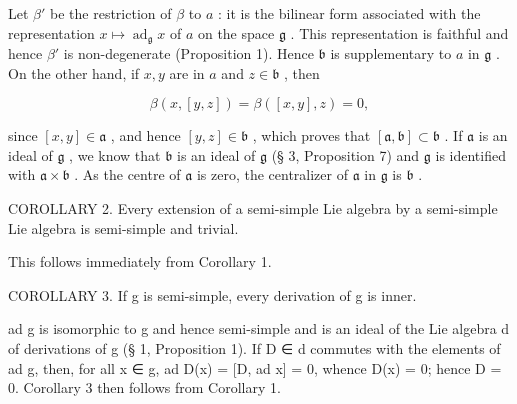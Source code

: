 Let \(\beta'\) be the restriction of \(\beta\) to \(a\) : it is the bilinear form associated with the representation \(x \mapsto \operatorname{ad}_{\mathfrak{g}} x\) of \(a\) on the space \(\mathfrak{g}\) . This representation is faithful and hence \(\beta'\) is non-degenerate (Proposition 1). Hence \(\mathfrak{b}\) is supplementary to \(a\) in \(\mathfrak{g}\) . On the other hand, if \(x, y\) are in \(a\) and \(z \in \mathfrak{b}\) , then

\[
\beta (x, [ y, z ]) = \beta ([ x, y ], z) = 0,
\]

 since \([x,y] \in \mathfrak{a}\) , and hence \([y,z] \in \mathfrak{b}\) , which proves that \([\mathfrak{a},\mathfrak{b}] \subset \mathfrak{b}\) . If \(\mathfrak{a}\) is an ideal of \(\mathfrak{g}\) , we know that \(\mathfrak{b}\) is an ideal of \(\mathfrak{g}\) (§ 3, Proposition 7) and \(\mathfrak{g}\) is identified with \(\mathfrak{a} \times \mathfrak{b}\) . As the centre of \(\mathfrak{a}\) is zero, the centralizer of \(\mathfrak{a}\) in \(\mathfrak{g}\) is \(\mathfrak{b}\) .

COROLLARY 2. Every extension of a semi-simple Lie algebra by a semi-simple Lie algebra is semi-simple and trivial.

This follows immediately from Corollary 1.

COROLLARY 3. If g is semi-simple, every derivation of g is inner.

ad g is isomorphic to g and hence semi-simple and is an ideal of the Lie algebra d of derivations of g (§ 1, Proposition 1). If D ∈ d commutes with the elements of ad g, then, for all x ∈ g, ad D(x) = {[}D, ad x{]} = 0, whence D(x) = 0; hence D = 0. Corollary 3 then follows from Corollary 1.
